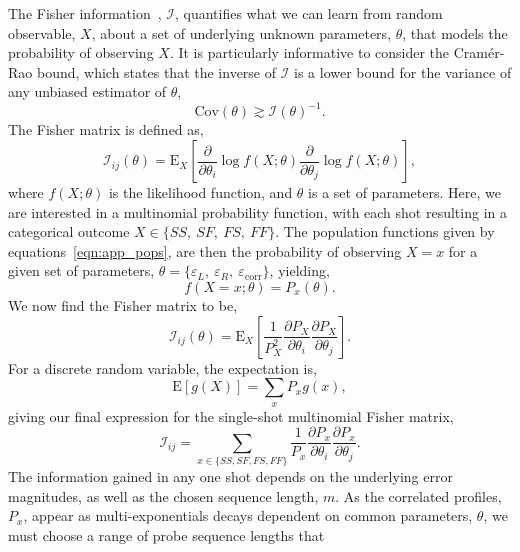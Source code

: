 The Fisher information~\cite{fisher_xxidominance_1923}, $\mathcal{I}$, quantifies what we can learn from random observable, $X$, about a set of underlying unknown parameters, $\theta$, that models the probability of observing $X$. It is particularly informative to consider the Cram\'er-Rao bound, which states that the inverse of $\mathcal{I}$ is a lower bound for the variance of any unbiased estimator of $\theta$,
\begin{equation}
    \mathrm{Cov}(\theta)\gtrsim\mathcal{I}(\theta)^{-1}.
\end{equation}
The Fisher matrix is defined as,
\begin{equation}
    \mathcal{I}_{ij}(\theta)= \mathrm{E}_X\left[ \frac{\partial}{\partial\theta_i}\log f(X;\theta)\frac{\partial}{\partial\theta_j}\log f(X;\theta)\right],
\end{equation}
where $f(X;\theta)$ is the likelihood function, and $\theta$ is a set of parameters. Here, we are interested in a multinomial probability function, with each shot resulting in a categorical outcome $X\in\{SS,~SF,~FS,~FF\}$. The population functions given by equations~\ref{eqn:app_pops}, are then the probability of observing $X=x$ for a given set of parameters, $\theta=\{\varepsilon_{L},~ \varepsilon_R,~\varepsilon_\mathrm{corr}\}$, yielding,
\begin{equation}
    f(X=x;\theta)=P_x(\theta).
\end{equation}
We now find the Fisher matrix to be,
\begin{equation}
    \mathcal{I}_{ij}(\theta) = \mathrm{E}_X\left[\frac{1}{P^2_X}\frac{\partial P_X}{\partial \theta_i}\frac{\partial P_X}{\partial \theta_j}\right].
\end{equation}
For a discrete random variable, the expectation is,
\begin{equation}
    \mathrm{E}[g(X)] = \sum_x P_x g(x),
\end{equation}
giving our final expression for the single-shot multinomial Fisher matrix,
\begin{equation}
    \label{eqn:FI}
    \mathcal{I}_{ij} = \sum_{x\in\{SS,SF,FS,FF\}} \frac{1}{P_x}\frac{\partial P_x}{\partial \theta_i}\frac{\partial P_x}{\partial \theta_j}.
\end{equation}
The information gained in any one shot depends on the underlying error
magnitudes, as well as the chosen sequence length, $m$. As the correlated
profiles, $P_x$, appear as multi-exponentials decays dependent on common
parameters, $\theta$, we must choose a range of probe sequence lengths that

